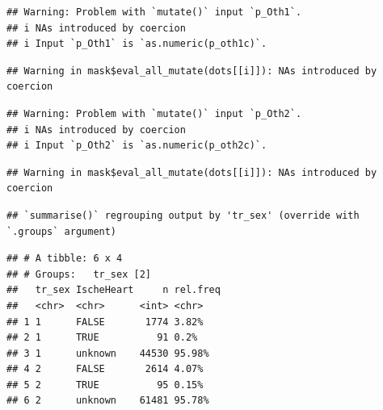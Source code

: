 \documentclass[
]{article}
\newenvironment{Shaded}{\begin{snugshade}}{\end{snugshade}}
\newcommand{\DataTypeTok}[1]{\textcolor[rgb]{0.13,0.29,0.53}{#1}}
\newcommand{\DecValTok}[1]{\textcolor[rgb]{0.00,0.00,0.81}{#1}}
\newcommand{\KeywordTok}[1]{\textcolor[rgb]{0.13,0.29,0.53}{\textbf{#1}}}
\newcommand{\NormalTok}[1]{#1}
\newcommand{\OperatorTok}[1]{\textcolor[rgb]{0.81,0.36,0.00}{\textbf{#1}}}
\newcommand{\OtherTok}[1]{\textcolor[rgb]{0.56,0.35,0.01}{#1}}
\newcommand{\StringTok}[1]{\textcolor[rgb]{0.31,0.60,0.02}{#1}}
\begin{document}
\begin{verbatim}
## Warning: Problem with `mutate()` input `p_Oth1`.
## i NAs introduced by coercion
## i Input `p_Oth1` is `as.numeric(p_oth1c)`.
\end{verbatim}

\begin{verbatim}
## Warning in mask$eval_all_mutate(dots[[i]]): NAs introduced by coercion
\end{verbatim}

\begin{verbatim}
## Warning: Problem with `mutate()` input `p_Oth2`.
## i NAs introduced by coercion
## i Input `p_Oth2` is `as.numeric(p_oth2c)`.
\end{verbatim}

\begin{verbatim}
## Warning in mask$eval_all_mutate(dots[[i]]): NAs introduced by coercion
\end{verbatim}

\begin{Shaded}
\end{Shaded}

\begin{verbatim}
## `summarise()` regrouping output by 'tr_sex' (override with `.groups` argument)
\end{verbatim}

\begin{verbatim}
## # A tibble: 6 x 4
## # Groups:   tr_sex [2]
##   tr_sex IscheHeart     n rel.freq
##   <chr>  <chr>      <int> <chr>   
## 1 1      FALSE       1774 3.82%   
## 2 1      TRUE          91 0.2%    
## 3 1      unknown    44530 95.98%  
## 4 2      FALSE       2614 4.07%   
## 5 2      TRUE          95 0.15%   
## 6 2      unknown    61481 95.78%
\end{verbatim}
\end{document}
